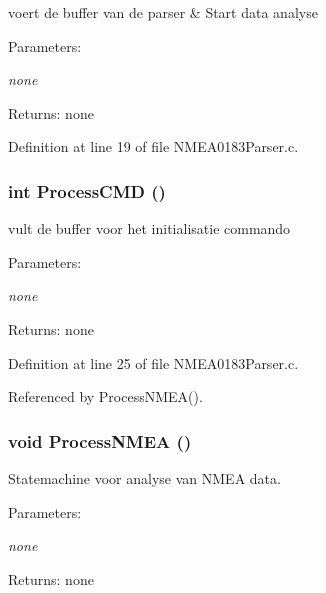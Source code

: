 voert de buffer van de parser \& Start data analyse 

\begin{Desc}
\item[Parameters:]
\begin{description}
\item[{\em none}]\end{description}
\end{Desc}
\begin{Desc}
\item[Returns:]none \end{Desc}


Definition at line 19 of file NMEA0183Parser.c.
\subsubsection{\setlength{\rightskip}{0pt plus 5cm}int ProcessCMD ()}\label{_n_m_e_a0183_parser_8c_571ac652c694e48662701b8e44793ed5}


vult de buffer voor het initialisatie commando 

\begin{Desc}
\item[Parameters:]
\begin{description}
\item[{\em none}]\end{description}
\end{Desc}
\begin{Desc}
\item[Returns:]none \end{Desc}


Definition at line 25 of file NMEA0183Parser.c.

Referenced by ProcessNMEA().
\subsubsection{\setlength{\rightskip}{0pt plus 5cm}void ProcessNMEA ()}\label{_n_m_e_a0183_parser_8c_39017658d97fcb6a6c680dac1b5065ab}


Statemachine voor analyse van NMEA data. 

\begin{Desc}
\item[Parameters:]
\begin{description}
\item[{\em none}]\end{description}
\end{Desc}
\begin{Desc}
\item[Returns:]none \end{Desc}


